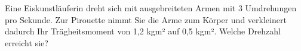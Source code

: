 \begin{ExerciseBlock}
Eine Eiskunstläuferin dreht sich mit ausgebreiteten Armen mit 3 Umdrehungen pro Sekunde. Zur Pirouette nimmt Sie die Arme zum Körper und verkleinert dadurch Ihr Trägheitsmoment von 1,2 kgm² auf 0,5 kgm². Welche Drehzahl erreicht sie?
\end{ExerciseBlock}
